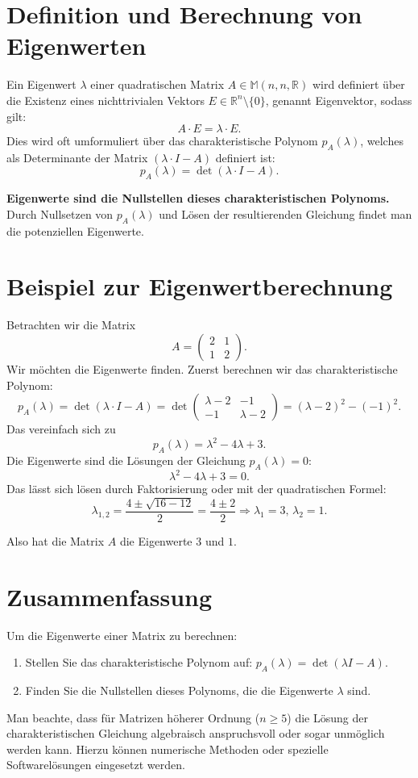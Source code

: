 \documentclass[a4paper,12pt]{article}
\begin{document}
\section*{Definition und Berechnung von Eigenwerten}

Ein Eigenwert $\lambda$ einer quadratischen Matrix $A \in \mathbb{M}(n, n, \mathbb{R})$ wird definiert über die Existenz eines nichttrivialen Vektors $E \in \mathbb{R}^n \setminus \{0\}$, genannt Eigenvektor, sodass gilt:
\[
A \cdot E = \lambda \cdot E.
\]
Dies wird oft umformuliert über das charakteristische Polynom $p_A(\lambda)$, welches als Determinante der Matrix $(\lambda \cdot I - A)$ definiert ist:
\[
p_A(\lambda) = \det(\lambda \cdot I - A).
\]

\textbf{Eigenwerte sind die Nullstellen dieses charakteristischen Polynoms.} Durch Nullsetzen von $p_A(\lambda)$ und Lösen der resultierenden Gleichung findet man die potenziellen Eigenwerte.

\section*{Beispiel zur Eigenwertberechnung}

Betrachten wir die Matrix
\[
A = \begin{pmatrix} 2 & 1 \\ 1 & 2 \end{pmatrix}.
\]
Wir möchten die Eigenwerte finden. Zuerst berechnen wir das charakteristische Polynom:
\[
p_A(\lambda) = \det(\lambda \cdot I - A) = \det\begin{pmatrix} \lambda - 2 & -1 \\ -1 & \lambda - 2 \end{pmatrix} = (\lambda-2)^2 - (-1)^2.
\]
Das vereinfach sich zu
\[
p_A(\lambda) = \lambda^2 - 4\lambda + 3.
\]
Die Eigenwerte sind die Lösungen der Gleichung $p_A(\lambda) = 0$:
\[
\lambda^2 - 4\lambda + 3 = 0.
\]
Das lässt sich lösen durch Faktorisierung oder mit der quadratischen Formel:
\[
\lambda_{1,2} = \frac{4 \pm \sqrt{16 - 12}}{2} = \frac{4 \pm 2}{2} \Rightarrow \lambda_1 = 3,\, \lambda_2 = 1.
\]

Also hat die Matrix $A$ die Eigenwerte $3$ und $1$.

\section*{Zusammenfassung}

Um die Eigenwerte einer Matrix zu berechnen:
\begin{enumerate}
    \item Stellen Sie das charakteristische Polynom auf: $p_A(\lambda) = \det(\lambda I - A)$.
    \item Finden Sie die Nullstellen dieses Polynoms, die die Eigenwerte $\lambda$ sind.
\end{enumerate}
Man beachte, dass für Matrizen höherer Ordnung ($n \geq 5$) die Lösung der charakteristischen Gleichung algebraisch anspruchsvoll oder sogar unmöglich werden kann. Hierzu können numerische Methoden oder spezielle Softwarelösungen eingesetzt werden.
\end{document}
